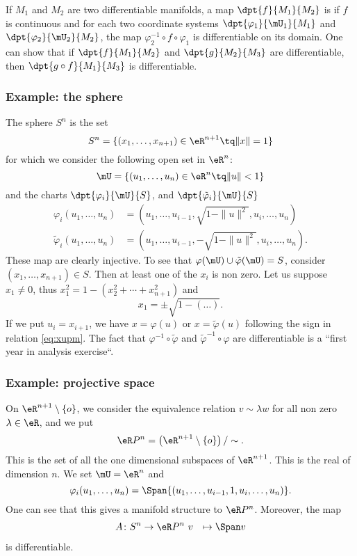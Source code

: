 If $M_1$ and $M_2$ are two differentiable manifolds, a map $\dpt{f}{M_1}{M_2}$ is  if $f$ is continuous and for each two coordinate systems $\dpt{\varphi_1}{\mU_1}{M_1}$ and $\dpt{\varphi_2}{\mU_2}{M_2}$, the map $\varphi_2^{-1}\circ f\circ\varphi_1$ is differentiable on its domain. One can show that if $\dpt{f}{M_1}{M_2}$ and $\dpt{g}{M_2}{M_3}$ are differentiable, then $\dpt{g\circ f}{M_1}{M_3}$ is differentiable.

\subsubsection{Example: the sphere}

The sphere $S^n$ is the set
\[
  S^n=\{  (x_1,\ldots, x_{n+1})\in\eR^{n+1}\tq \|x\|=1  \}
\]
for which we consider the following open set in $\eR^n$:
\[
   \mU=\{  (u_1,\ldots,u_n)\in\eR^n\tq\|u\|<1  \}
\]
and the charts $\dpt{\varphi_i}{\mU}{S}$, and $\dpt{\tilde{\varphi}_i}{\mU}{S}$
\begin{subequations}
\begin{align}
   \varphi_i(u_1,\ldots,u_n)&=(u_1,\ldots,u_{i-1}, \sqrt{  1-\|u\|^2  },u_i,\ldots,u_n )\\
   \tilde{\varphi}_i(u_1,\ldots,u_n)&=(u_1,\ldots,u_{i-1}, -\sqrt{  1-\|u\|^2  },u_i,\ldots,u_n ).
\end{align}
\end{subequations}
These map are clearly injective. To see that $\varphi(\mU)\cup\tilde{\varphi}(\mU)=S$, consider $(x_1,\ldots,x_{n+1})\in S$. Then at least one of the $x_i$ is non zero. Let us suppose $x_1\neq 0$, thus $x_1^2=1-(x_2^2+\cdots+x_{n+1}^2)$ and
\begin{equation}\label{eq:xupm}
   x_1=\pm\sqrt{1-(\ldots)}.
\end{equation}
If we put $u_i=x_{i+1}$, we have $x=\varphi(u)$ or $x=\tilde{\varphi}(u)$ following the sign in relation \eqref{eq:xupm}. The fact that $\varphi^{-1}\circ\tilde{\varphi}$ and $\tilde{\varphi}^{-1}\circ\varphi$ are differentiable is a ``first year in analysis exercise``.

\subsubsection{Example: projective space}

On $\eR^{n+1}\setminus\{o\}$, we consider the equivalence relation $v\sim\lambda w$ for all non zero $\lambda\in\eR$, and we put
\[
  \eR P^n=\left(\eR^{n+1}\setminus\{o\}\right)/\sim.
\]
This is the set of all the one dimensional subspaces of $\eR^{n+1}$. This is the real  of dimension $n$. We set $\mU=\eR^n$ and
\[
  \varphi_i(u_1,\ldots,u_n)=\Span\{ (u_1,\ldots,u_{i-1},1,u_i,\ldots,u_n) \}.
\]
One can see that this gives a manifold structure to $\eR P^n$. Moreover, the map
		\begin{equation}
		\begin{aligned}
			A \colon S^n &\to \eR P^n\
			v&\mapsto \Span v
		\end{aligned}
	\end{equation}
is differentiable.


